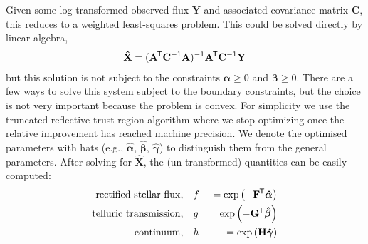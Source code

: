 \documentclass[modern,linenumbers]{aastex631}
\renewcommand{\vec}[1]{\mathbf{#1}}
\newcommand{\vecalpha}{\boldsymbol{\alpha}}
\newcommand{\vecbeta}{\boldsymbol{\beta}}
\newcommand*{\transpose}{^{\mkern-1.5mu\mathsf{T}}}
\newcommand{\todo}[1]{\textcolor{tab:red}{#1}}
\renewcommand{\added}[1]{#1}
\begin{document}
Given some log-transformed observed flux $\vec{Y}$ and associated covariance matrix $\vec{C}$, this reduces to a weighted least-squares problem. This could be solved directly by linear algebra,
\begin{eqnarray}
    \vec{\hat{X}} = (\vec{A}\transpose\vec{C}^{-1}\vec{A})^{-1}\vec{A}\transpose\vec{C}^{-1}\vec{Y}
\end{eqnarray}
\noindent{}but this solution is not subject to the constraints $\vecalpha \geq 0$ and $\vecbeta \geq 0$. There are a few ways to solve this system subject to the boundary constraints, but the choice is not very important because the problem is convex. For simplicity we use the truncated reflective trust region algorithm where we stop optimizing once the relative improvement has reached machine precision. \added{We denote the optimised parameters with hats (e.g., $\boldsymbol{\hat{\alpha}}$, $\boldsymbol{\hat{\beta}}$, $\boldsymbol{\hat{\gamma}}$) to distinguish them from the general parameters.}
After solving for $\vec{\hat{X}}$, the (un-transformed) quantities can be easily computed:
\begin{eqnarray}
    \mathrm{rectified~stellar~flux}, \quad &f& = \exp{\left(-\vec{F}\transpose\boldsymbol{\hat{\alpha}}\right)} \\
    \mathrm{telluric~transmission},\quad  &g& = \exp{\left(-\vec{G}\transpose\boldsymbol{\hat{\beta}}\right)} \\
    \mathrm{continuum}, \quad &h& = \exp{\left(\vec{H}\boldsymbol{\hat{\gamma}}\right)}
\end{eqnarray}
\end{document}
